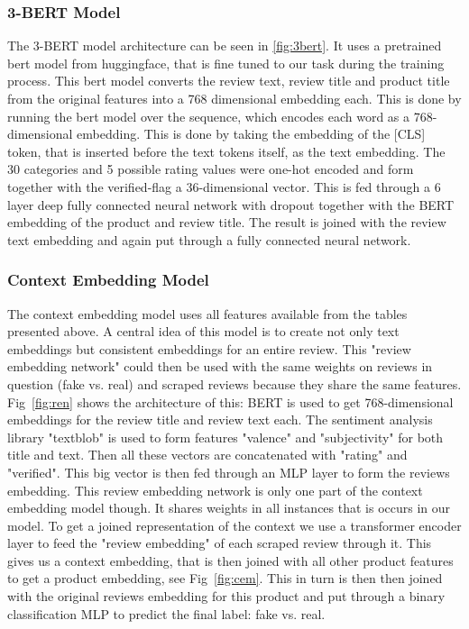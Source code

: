 \documentclass{article}
\begin{document}
\subsubsection{3-BERT Model}

The 3-BERT model architecture can be seen in \ref{fig:3bert}. It uses a pretrained bert model from huggingface, that is fine tuned to our task during the training process. This bert model converts the review text, review title and product title from the original features into a 768 dimensional embedding each. This is done by running the bert model over the sequence, which encodes each word as a 768-dimensional embedding.
This is done by taking the embedding of the [CLS] token, that is inserted before the text tokens itself, as the text embedding.
The 30 categories and 5 possible rating values were one-hot encoded and form together with the verified-flag a 36-dimensional vector. This is fed through a 6 layer deep fully connected neural network with dropout together with the BERT embedding of the product and review title. The result is joined with the review text embedding and again put through a fully connected neural network.

\subsubsection{Context Embedding Model}

The context embedding model uses all features available from the tables presented above. A central idea of this model is to create not only text embeddings but consistent embeddings for an entire review. This "review embedding network" could then be used with the same weights on reviews in question (fake vs. real) and scraped reviews because they share the same features. Fig~\ref{fig:ren} shows the architecture of this: BERT is used to get 768-dimensional embeddings for the review title and review text each. The sentiment analysis library "textblob" is used to form features "valence" and "subjectivity" for both title and text. Then all these vectors are concatenated with "rating" and "verified". This big vector is then fed through an MLP layer to form the reviews embedding. This review embedding network is only one part of the context embedding model though. It shares weights in all instances that is occurs in our model. To get a joined representation of the context we use a transformer encoder layer to feed the "review embedding" of each scraped review through it. This gives us a context embedding, that is then joined with all other product features to get a product embedding, see Fig~\ref{fig:cem}. This in turn is then then joined with the original reviews embedding for this product and put through a binary classification MLP to predict the final label: fake vs. real.
\end{document}
